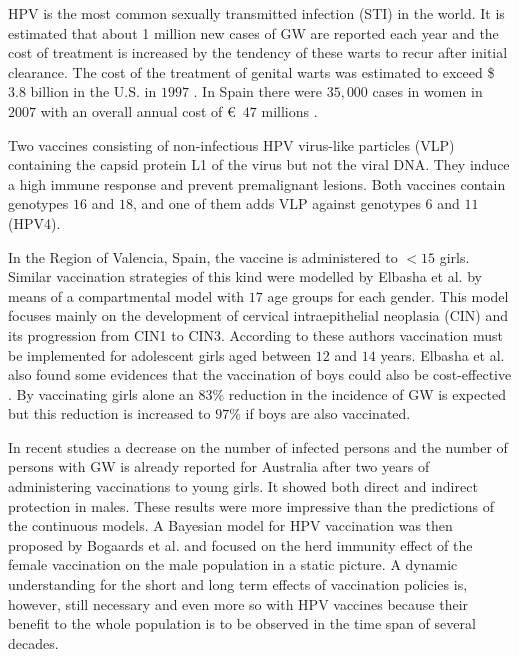 HPV is the most common sexually transmitted infection (STI) in the world. It is estimated that about 1 million new cases of GW are reported each year and the cost of treatment is increased by the tendency of these warts to recur after initial clearance. The cost of the treatment of genital warts was estimated to exceed \$ $3.8$ billion in the U.S. in $1997$ \cite{roberts1999vaccine}. In Spain there were $35,000$ cases in women in $2007$ with an overall annual cost of \euro \ $47$ millions \cite{castellsague2012prevalence}.

Two vaccines consisting of non-infectious HPV virus-like particles (VLP) \cite{mcneil2006invented} containing the capsid protein L1 of the virus but not the viral DNA. They induce a high immune response and prevent premalignant lesions. Both vaccines contain genotypes $16$ and $18$, and one of them adds VLP against genotypes $6$ and $11$ (HPV4).

In the Region of Valencia, Spain, the vaccine is administered to $< 15$ girls. Similar vaccination strategies of this kind were modelled by Elbasha et al. \cite{elbasha2007model,elbasha2005vaccination} by means of a compartmental model with $17$ age groups for each gender. This model focuses mainly on the development of cervical intraepithelial neoplasia (CIN) and its progression from CIN1 to CIN3. According to these authors vaccination must be implemented for adolescent girls aged between $12$ and $14$ years. Elbasha et al. also found some evidences that the vaccination of boys could also be cost-effective \cite{elbasha2007model}. By vaccinating girls alone an $83\%$ reduction in the incidence of GW is expected but this reduction is increased to $97\%$ if boys are also vaccinated.

In recent studies \cite{fairley2009rapid,ali2013genital} a decrease on the number of infected persons and the number of persons with GW is already reported for Australia after two years of administering vaccinations to young girls. It showed both direct and indirect protection in males. These results were more impressive than the predictions of the continuous models. A Bayesian model for HPV vaccination was then proposed by Bogaards et al. \cite{bogaards2015direct} and focused on the herd immunity effect of the female vaccination on the male population in a static picture. A dynamic understanding for the short and long term effects of vaccination policies is, however, still necessary and even more so with HPV vaccines because their benefit to the whole population is to be observed in the time span of several decades.

